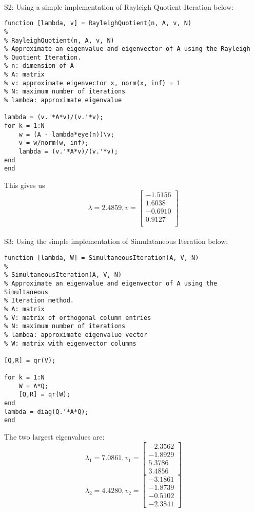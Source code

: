 \documentclass[12pt]{article}
\begin{document}
\\
S2: Using a simple implementation of Rayleigh Quotient Iteration below:
\begin{lstlisting}
function [lambda, v] = RayleighQuotient(n, A, v, N)
%
% RayleighQuotient(n, A, v, N)
% Approximate an eigenvalue and eigenvector of A using the Rayleigh
% Quotient Iteration.
% n: dimension of A
% A: matrix
% v: approximate eigenvector x, norm(x, inf) = 1
% N: maximum number of iterations
% lambda: approximate eigenvalue

lambda = (v.'*A*v)/(v.'*v);
for k = 1:N
    w = (A - lambda*eye(n))\v;
    v = w/norm(w, inf);
    lambda = (v.'*A*v)/(v.'*v);
end
end
\end{lstlisting}
This gives us
\[
\lambda = 2.4859, v =
\begin{bmatrix}
-1.5156\\
1.6038\\
-0.6910\\
0.9127\\
\end{bmatrix}
\]
\\
S3: Using the simple implementation of Simulataneous Iteration below:
\begin{lstlisting}
function [lambda, W] = SimultaneousIteration(A, V, N)
%
% SimultaneousIteration(A, V, N)
% Approximate an eigenvalue and eigenvector of A using the Simultaneous
% Iteration method.
% A: matrix
% V: matrix of orthogonal column entries
% N: maximum number of iterations
% lambda: approximate eigenvalue vector
% W: matrix with eigenvector columns

[Q,R] = qr(V);

for k = 1:N
    W = A*Q;
    [Q,R] = qr(W);
end
lambda = diag(Q.'*A*Q);
end
\end{lstlisting}
The two largest eigenvalues are:
\[
\lambda_1 = 7.0861, v_1 =
\begin{bmatrix}
-2.3562\\-1.8929\\5.3786\\3.4856
\end{bmatrix}
\]
\[
\lambda_2 = 4.4280, v_2 = 
\begin{bmatrix}
-3.1861\\-1.8739\\-0.5102\\-2.3841
\end{bmatrix}
\]
\end{document}
